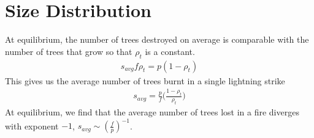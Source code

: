\documentclass{article}
\numberwithin{equation}{section}
\begin{document}
\section{Size Distribution}
At equilibrium, the number of trees destroyed on average is comparable with the number of trees that grow so that $\rho_t$ is a constant.  
\begin{align}
    s_{avg} f \rho_t = p (1-\rho_t) 
\end{align}
This gives us the average number of trees burnt in a single lightning strike 
\begin{align}
    s_{avg} = \frac{p}{f}\big(\frac{1-\rho_t}{\rho_t} \big)
\end{align}
At equilibrium, we find that the average number of trees lost in a fire diverges with exponent $-1$, $s_{avg} \sim (\frac{f}{p})^{-1}$. 
\end{document}
